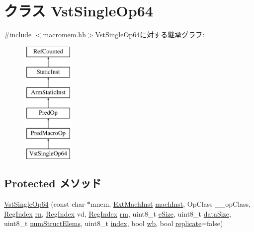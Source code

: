 \hypertarget{classArmISA_1_1VstSingleOp64}{
\section{クラス VstSingleOp64}
\label{classArmISA_1_1VstSingleOp64}
}


{\ttfamily \#include $<$macromem.hh$>$}VstSingleOp64に対する継承グラフ:\begin{figure}[H]
\begin{center}
\leavevmode
\includegraphics[height=6cm]{classArmISA_1_1VstSingleOp64}
\end{center}
\end{figure}
\subsection*{Protected メソッド}
\begin{DoxyCompactItemize}
\item 
\hyperlink{classArmISA_1_1VstSingleOp64_a009a820bb99cfc9faf08044c53c9c928}{VstSingleOp64} (const char $\ast$mnem, \hyperlink{classStaticInst_a5605d4fc727eae9e595325c90c0ec108}{ExtMachInst} \hyperlink{classStaticInst_a744598b194ca3d4201d9414ce4cc4af4}{machInst}, OpClass \_\-\_\-opClass, \hyperlink{classStaticInst_a36d25e03e43fa3bb4c5482cbefe5e0fb}{RegIndex} \hyperlink{namespaceArmISA_adf8c6c579ad8729095a637a4f2181211}{rn}, \hyperlink{classStaticInst_a36d25e03e43fa3bb4c5482cbefe5e0fb}{RegIndex} vd, \hyperlink{classStaticInst_a36d25e03e43fa3bb4c5482cbefe5e0fb}{RegIndex} \hyperlink{namespaceArmISA_ad546c2cf2168cf2d8ac21b2a9f485e82}{rm}, uint8\_\-t \hyperlink{classArmISA_1_1VstSingleOp64_aac129ded07ba57383c5e2540f22c94ef}{eSize}, uint8\_\-t \hyperlink{classArmISA_1_1VstSingleOp64_af13e629a2f79d14821c7b9246ef99e9f}{dataSize}, uint8\_\-t \hyperlink{classArmISA_1_1VstSingleOp64_afb0be420b537599a5b86558127502040}{numStructElems}, uint8\_\-t \hyperlink{classArmISA_1_1VstSingleOp64_aae5a12e607d0f782506d9e6ec6179c64}{index}, bool \hyperlink{classArmISA_1_1VstSingleOp64_a93541ed16711b2c9c53cf093b675d90b}{wb}, bool \hyperlink{classArmISA_1_1VstSingleOp64_a8f2b56ecc4db4f48e2c08aef78591efc}{replicate}=false)
\end{DoxyCompactItemize}
